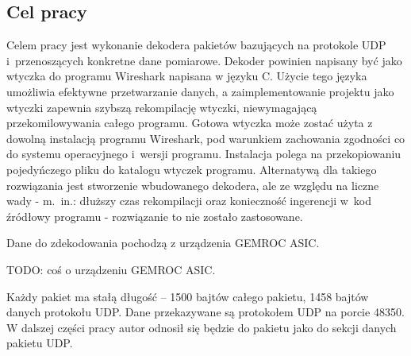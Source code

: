 \documentclass[a4paper, 12pt, twoside, openright]{article}
\begin{document}
	\newpage
\subsection{Cel pracy}

	\indent\par
	Celem pracy jest wykonanie dekodera pakietów bazujących na protokole UDP i~przenoszących konkretne dane pomiarowe.
	Dekoder powinien napisany być jako wtyczka do programu Wireshark napisana w języku C. Użycie tego języka umożliwia efektywne
	przetwarzanie danych, a zaimplementowanie projektu jako wtyczki zapewnia szybszą rekompilację wtyczki,
	niewymagającą przekomilowywania całego programu. Gotowa wtyczka może zostać użyta z dowolną instalacją programu Wireshark,
	pod warunkiem zachowania zgodności co do systemu operacyjnego i~wersji programu. Instalacja polega na przekopiowaniu
	pojedyńczego pliku do katalogu wtyczek programu. Alternatywą dla takiego rozwiązania jest stworzenie wbudowanego dekodera,
	ale ze względu na liczne wady - m.~in.: dłuższy czas rekompilacji oraz konieczność ingerencji w~kod źródłowy programu - rozwiązanie
	to nie zostało zastosowane.

	Dane do zdekodowania pochodzą z urządzenia GEMROC ASIC.

	TODO: coś o urządzeniu GEMROC ASIC.

	Każdy pakiet ma stałą długość -- 1500 bajtów całego pakietu, 1458 bajtów danych protokołu UDP.
	Dane przekazywane są protokołem UDP na porcie 48350.
	W dalszej części pracy autor odnosił się będzie do pakietu jako do sekcji danych pakietu UDP.
\end{document}
